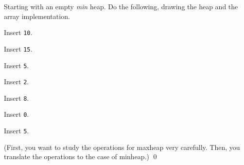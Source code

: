 \newpage
\begin{ex}
Starting with an empty \textit{min} heap.
Do the following, drawing the heap and the array implementation.
\begin{tightlist}
  \item Insert \texttt{10}.
  \item Insert \texttt{15}.
  \item Insert \texttt{5}.
  \item Insert \texttt{2}.
  \item Insert \texttt{8}.
  \item Insert \texttt{0}.
  \item Insert \texttt{5}.
\end{tightlist}
(First, you want to study the operations for maxheap very carefully.
Then, you translate the operations to the case of minheap.)
\qed
\end{ex}

